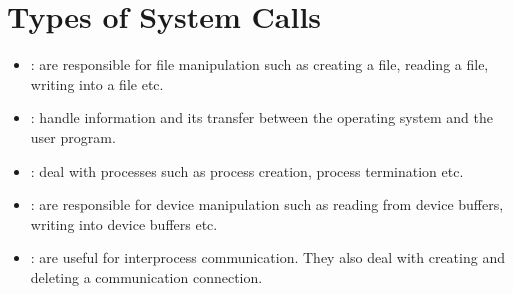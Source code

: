 \documentclass{article}
\begin{document}
\section*{Types of System Calls}
\begin{itemize}
	\item {}: are responsible for file manipulation such as creating a file, reading a file, writing into a file etc.
	\item {}: handle information and its transfer between the operating system and the user program.
	\item {}: deal with processes such as process creation, process termination etc.
	\item {}: are responsible for device manipulation such as reading from device buffers, writing into device buffers etc.
	\item {}: are useful for interprocess communication. They also deal with creating and deleting a communication connection.
\end{itemize}
\end{document}
